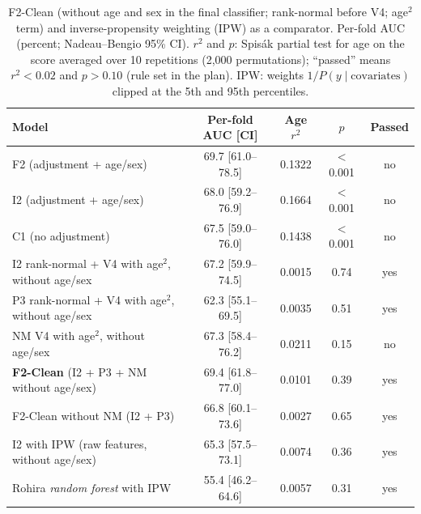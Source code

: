 \begin{table}[t]
\caption{F2-Clean (without age and sex in the final classifier; rank-normal before V4; age$^2$ term) and inverse-propensity weighting (IPW) as a comparator. Per-fold AUC (percent; Nadeau--Bengio 95\% CI). $r^2$ and $p$: Spis\'ak partial test for age on the score averaged over 10 repetitions (2,000 permutations); ``passed'' means $r^2<0.02$ and $p>0.10$ (rule set in the plan). IPW: weights $1/P(y\mid\text{covariates})$ clipped at the 5th and 95th percentiles.}\label{tab:f2clean}
\centering\scriptsize
\setlength{\tabcolsep}{3pt}
\begin{tabular}{p{}cccc}
\toprule
Model & Per-fold AUC [CI] & Age $r^2$ & $p$ & Passed \\
\midrule
F2 (adjustment + age/sex) & 69.7 [61.0--78.5] & 0.1322 & $<$0.001 & no \\
I2 (adjustment + age/sex) & 68.0 [59.2--76.9] & 0.1664 & $<$0.001 & no \\
C1 (no adjustment) & 67.5 [59.0--76.0] & 0.1438 & $<$0.001 & no \\
I2 rank-normal + V4 with age$^2$, without age/sex & 67.2 [59.9--74.5] & 0.0015 & 0.74 & yes \\
P3 rank-normal + V4 with age$^2$, without age/sex & 62.3 [55.1--69.5] & 0.0035 & 0.51 & yes \\
NM V4 with age$^2$, without age/sex & 67.3 [58.4--76.2] & 0.0211 & 0.15 & no \\
\textbf{F2-Clean} (I2 + P3 + NM without age/sex) & 69.4 [61.8--77.0] & 0.0101 & 0.39 & yes \\
F2-Clean without NM (I2 + P3) & 66.8 [60.1--73.6] & 0.0027 & 0.65 & yes \\
I2 with IPW (raw features, without age/sex) & 65.3 [57.5--73.1] & 0.0074 & 0.36 & yes \\
Rohira \textit{random forest} with IPW & 55.4 [46.2--64.6] & 0.0057 & 0.31 & yes \\
\bottomrule
\end{tabular}
\end{table}
